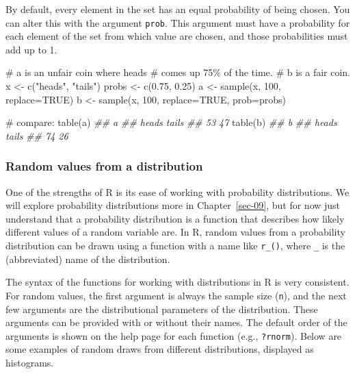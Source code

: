 \documentclass[
  13,
  letterpaper,
]{report}
\newenvironment{Shaded}{\begin{snugshade}}{\end{snugshade}}
\newcommand{\AttributeTok}[1]{\textcolor[rgb]{0.40,0.45,0.13}{#1}}
\newcommand{\CommentTok}[1]{\textcolor[rgb]{0.37,0.37,0.37}{#1}}
\newcommand{\ConstantTok}[1]{\textcolor[rgb]{0.56,0.35,0.01}{#1}}
\newcommand{\DecValTok}[1]{\textcolor[rgb]{0.68,0.00,0.00}{#1}}
\newcommand{\DocumentationTok}[1]{\textcolor[rgb]{0.37,0.37,0.37}{\textit{#1}}}
\newcommand{\FloatTok}[1]{\textcolor[rgb]{0.68,0.00,0.00}{#1}}
\newcommand{\FunctionTok}[1]{\textcolor[rgb]{0.28,0.35,0.67}{#1}}
\newcommand{\NormalTok}[1]{\textcolor[rgb]{0.00,0.23,0.31}{#1}}
\newcommand{\OtherTok}[1]{\textcolor[rgb]{0.00,0.23,0.31}{#1}}
\newcommand{\StringTok}[1]{\textcolor[rgb]{0.13,0.47,0.30}{#1}}
\begin{document}
By default, every element in the set has an equal probability of being
chosen. You can alter this with the argument \texttt{prob}. This
argument must have a probability for each element of the set from which
value are chosen, and those probabilities must add up to 1.

\begin{Shaded}
\begin{Highlighting}[]
\CommentTok{\# a is an unfair coin where heads}
\CommentTok{\# comes up 75\% of the time.}
\CommentTok{\# b is a fair coin.}
\NormalTok{x }\OtherTok{\textless{}{-}} \FunctionTok{c}\NormalTok{(}\StringTok{"heads"}\NormalTok{, }\StringTok{"tails"}\NormalTok{)}
\NormalTok{probs }\OtherTok{\textless{}{-}} \FunctionTok{c}\NormalTok{(}\FloatTok{0.75}\NormalTok{, }\FloatTok{0.25}\NormalTok{)}
\NormalTok{a }\OtherTok{\textless{}{-}} \FunctionTok{sample}\NormalTok{(x, }\DecValTok{100}\NormalTok{, }\AttributeTok{replace=}\ConstantTok{TRUE}\NormalTok{)}
\NormalTok{b }\OtherTok{\textless{}{-}} \FunctionTok{sample}\NormalTok{(x, }\DecValTok{100}\NormalTok{, }\AttributeTok{replace=}\ConstantTok{TRUE}\NormalTok{, }\AttributeTok{prob=}\NormalTok{probs)}

\CommentTok{\# compare:}
\FunctionTok{table}\NormalTok{(a)}
\DocumentationTok{\#\# a}
\DocumentationTok{\#\# heads tails }
\DocumentationTok{\#\#    53    47}
\FunctionTok{table}\NormalTok{(b)}
\DocumentationTok{\#\# b}
\DocumentationTok{\#\# heads tails }
\DocumentationTok{\#\#    74    26}
\end{Highlighting}
\end{Shaded}

\subsubsection{Random values from a
distribution}\label{sec-05-make-rand-dist}

One of the strengths of R is its ease of working with probability
distributions. We will explore probability distributions more in
Chapter~\ref{sec-09}, but for now just understand that a probability
distribution is a function that describes how likely different values of
a random variable are. In R, random values from a probability
distribution can be drawn using a function with a name like
\texttt{r\_()}, where \texttt{\_} is the (abbreviated) name of the
distribution.

The syntax of the functions for working with distributions in R is very
consistent. For random values, the first argument is always the sample
size (\texttt{n}), and the next few arguments are the distributional
parameters of the distribution. These arguments can be provided with or
without their names. The default order of the arguments is shown on the
help page for each function (e.g., \texttt{?rnorm}). Below are some
examples of random draws from different distributions, displayed as
histograms.
\end{document}
